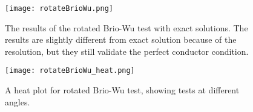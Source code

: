  \begin{figure}
      \centering
      \texttt{[image: rotateBrioWu.png]}
      \caption[Lineout for rotated Brio-Wu]{The results of the rotated Brio-Wu test with exact solutions. The results are slightly different from exact solution because of the resolution, but they still validate the perfect conductor condition.}
      \label{fig:rotateBrioWu}
  \end{figure}
  \begin{figure}
      \centering
      \texttt{[image: rotateBrioWu\_heat.png]}
      \caption[Heat plot for rotated Brio-Wu test]{A heat plot for rotated Brio-Wu test, showing tests at different angles.}
      \label{fig:rotateBrioWu_heat}
  \end{figure}

  

